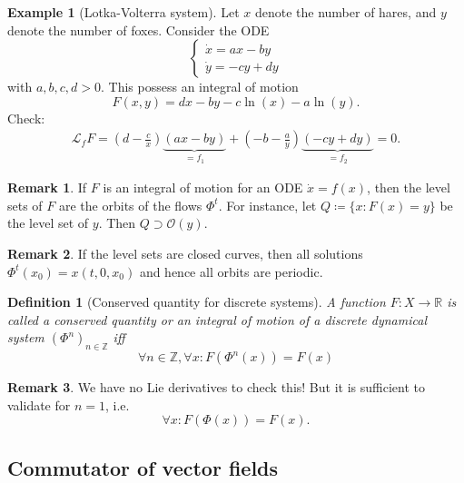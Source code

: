 \documentclass[hidelinks,a4paper, 11pt]{article}
\theoremstyle{plain}
\theoremstyle{break}
\theoremstyle{plain}
\newtheorem{definition}[theorem]{Definition}
\theoremstyle{definition}
\newtheorem*{example}{Example}
\newtheorem*{remark}{Remark}
\begin{document}
\begin{example}[Lotka-Volterra system]
	Let $x$ denote the number of hares, and $y$ denote the number of foxes. Consider the ODE
	\[
		\begin{cases}
		\dot x = ax-by \\
		\dot y = -cy +dy
		\end{cases}
	\]
	with $a,b,c,d > 0$. This possess an integral of motion
	\[
		F(x,y) = dx-by-c \ln(x) - a\ln(y).
	\]
	Check:
	\begin{align*}
		\mathcal L_fF = (d - \frac{c}{x})\underbrace{(ax - by)}_{=f_1} + (-b-\frac{a}{y})\underbrace{(-cy+dy)}_{=f_2} = 0.
	\end{align*}
\end{example}

\begin{remark}
	If $F$ is an integral of motion for an ODE $\dot x = f(x)$, then the level sets of $F$ are the orbits of the flows $\Phi^t$. For instance, let $Q \coloneqq \{ x : F(x) = y \}$ be the level set of $y$. Then $Q \supset \mathcal O(y)$.
\end{remark}

\begin{remark}
	If the level sets are closed curves, then all solutions $\Phi^t(x_0) = x(t,0,x_0)$ and hence all orbits are periodic.
\end{remark}

\begin{definition}[Conserved quantity for discrete systems]
	A function $F: X \to \mathbb R$ is called a conserved quantity or an integral of motion of a discrete dynamical system $(\Phi^n)_{n \in \mathbb Z}$ iff 
	\[
		\forall n \in \mathbb Z, \forall x: F(\Phi^n(x)) = F(x)
	\]
\end{definition}
\begin{remark}
	We have no Lie derivatives to check this! But it is sufficient to validate for $n=1$, i.e.
	\[
		\forall x: F(\Phi(x)) = F(x).
	\]
\end{remark}

\subsection{Commutator of vector fields}


\end{document}
